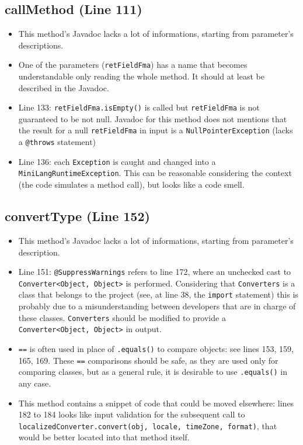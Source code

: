 \documentclass[11pt]{article} %
\begin{document}
\subsection{callMethod (Line 111)}
\begin{itemize}
	\item This method's Javadoc lacks a lot of informations, starting from parameter's descriptions.
	\item One of the parameters (\texttt{retFieldFma}) has a name that becomes understandable only reading the whole method. It should at least be described in the Javadoc.
	\item Line 133: \texttt{retFieldFma.isEmpty()} is called but \texttt{retFieldFma} is not guaranteed to be not null. Javadoc for this method does not mentions that the result for a null \texttt{retFieldFma} in input is a \texttt{NullPointerException} (lacks a \texttt{@throws} statement)
	\item Line 136: each \texttt{Exception} is caught and changed into a \texttt{MiniLangRuntimeException}. This can be reasonable considering the context (the code simulates a method call), but looks like a code smell.
\end{itemize}

\subsection{convertType (Line 152)}
\begin{itemize}
	\item This method's Javadoc lacks a lot of informations, starting from parameter's description.
	\item Line 151: \texttt{@SuppressWarnings} refers to line 172, where an unchecked cast to \texttt{Converter<Object, Object>} is performed. Considering that \texttt{Converters} is a class that belongs to the project (see, at line 38, the \texttt{import} statement) this is probably due to a misunderstanding between developers that are in charge of these classes. \texttt{Converters} should be modified to provide a \texttt{Converter<Object, Object>} in output.
	\item \texttt{==} is often used in place of \texttt{.equals()} to compare objects: see lines 153, 159, 165, 169. These \texttt{==} comparisons should be safe, as they are used only for comparing classes, but as a general rule, it is desirable to use \texttt{.equals()} in any case.
	\item This method contains a snippet of code that could be moved elsewhere: lines 182 to 184 looks like input validation for the subsequent call to \texttt{localizedConverter.convert(obj, locale, timeZone, format)}, that would be better located into that method itself.
\end{itemize}
\end{document}
